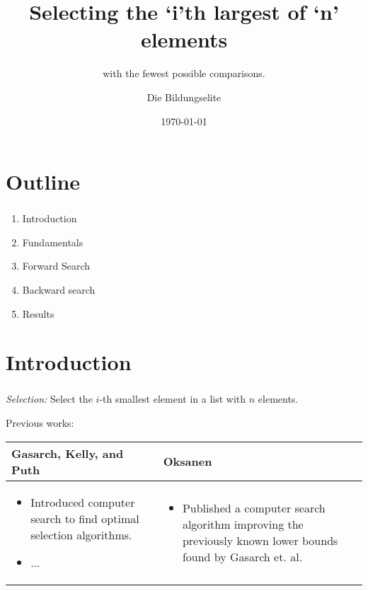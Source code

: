\documentclass{beamer}
\title{Selecting the `i'th largest of `n' elements}
\subtitle{with the fewest possible comparisons.}
\author{Die Bildungselite}
\date{\today}
\begin{document}
\begin{frame}
    \titlepage
\end{frame}

\section{Outline}

\begin{frame}
    \frametitle{\insertsection}
    \begin{enumerate}[1.]
        \item Introduction
        \item Fundamentals
        \item Forward Search
        \item Backward search
        \item Results
    \end{enumerate}
\end{frame}

\section{Introduction}
\begin{frame}
    \frametitle{\insertsection} 


    \textit{Selection:} Select the $i$-th smallest element in a list with $n$ elements.

    \vspace{5mm} 
    Previous works: 

    \vspace{5mm}
    \begin{tabular}{|p{5cm}|p{5cm}|}
        \hline
        Gasarch, Kelly, and Puth & Oksanen \\ 
        \hline
        \raggedright \begin{itemize}
            \item Introduced computer search to find optimal selection algorithms.
            \item ...
        \end{itemize} & 
        \raggedright \begin{itemize}
            \item Published a computer search algorithm improving the previously known lower bounds found
            by Gasarch et. al. 
        \end{itemize}
    \end{tabular}
\end{frame}
\end{document}

